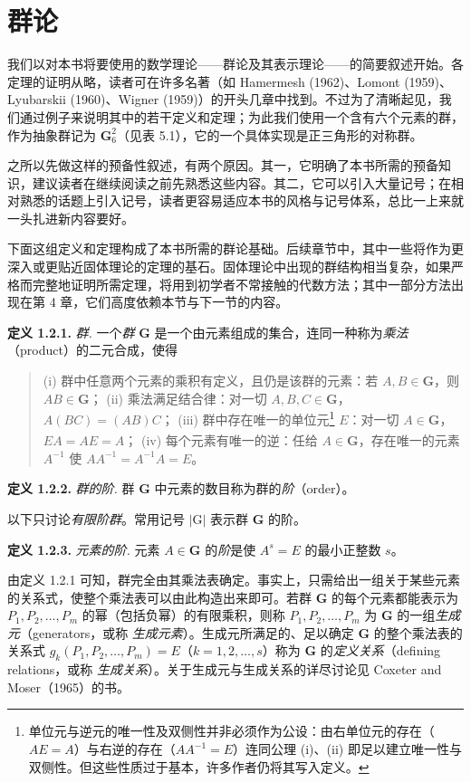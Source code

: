\section{群论}

我们以对本书将要使用的数学理论——群论及其表示理论——的简要叙述开始。各定理的证明从略，读者可在许多名著（如 Hamermesh (1962)、Lomont (1959)、Lyubarskii (1960)、Wigner (1959)）的开头几章中找到。不过为了清晰起见，我们通过例子来说明其中的若干定义和定理；为此我们使用一个含有六个元素的群，作为抽象群记为 $\mathbf{G}_6^2$（见表 5.1），它的一个具体实现是正三角形的对称群。

之所以先做这样的预备性叙述，有两个原因。其一，它明确了本书所需的预备知识，建议读者在继续阅读之前先熟悉这些内容。其二，它可以引入大量记号；在相对熟悉的话题上引入记号，读者更容易适应本书的风格与记号体系，总比一上来就一头扎进新内容要好。

下面这组定义和定理构成了本书所需的群论基础。后续章节中，其中一些将作为更深入或更贴近固体理论的定理的基石。固体理论中出现的群结构相当复杂，如果严格而完整地证明所需定理，将用到初学者不常接触的代数方法；其中一部分方法出现在第 4 章，它们高度依赖本节与下一节的内容。

\textbf{定义 1.2.1.} \textit{群.} 一个\textit{群} $\mathbf{G}$ 是一个由元素组成的集合，连同一种称为\textit{乘法}（product）的二元合成，使得

\begin{quote}
(i) 群中任意两个元素的乘积有定义，且仍是该群的元素：若 $A, B \in \mathbf{G}$，则 $AB \in \mathbf{G}$；
(ii) 乘法满足结合律：对一切 $A, B, C \in \mathbf{G}$，$A(BC) = (AB)C$；
(iii) 群中存在唯一的单位元\footnote{单位元与逆元的唯一性及双侧性并非必须作为公设：由右单位元的存在（$AE = A$）与右逆的存在（$AA^{-1} = E$）连同公理 (i)、(ii) 即足以建立唯一性与双侧性。但这些性质过于基本，许多作者仍将其写入定义。} $E$：对一切 $A \in \mathbf{G}$，$EA = AE = A$；
(iv) 每个元素有唯一的逆\textsuperscript{\ddag}：任给 $A \in \mathbf{G}$，存在唯一的元素 $A^{-1}$ 使 $AA^{-1} = A^{-1}A = E$。
\end{quote}

\textbf{定义 1.2.2.} \textit{群的阶.} 群 $\mathbf{G}$ 中元素的数目称为群的\textit{阶}（order）。

以下只讨论\textit{有限阶群}。常用记号 $|\mathrm{G}|$ 表示群 $\mathbf{G}$ 的阶。

\textbf{定义 1.2.3.} \textit{元素的阶.} 元素 $A \in \mathbf{G}$ 的\textit{阶}是使 $A^{s} = E$ 的最小正整数 $s$。

由定义 1.2.1 可知，群完全由其乘法表确定。事实上，只需给出一组关于某些元素的关系式，使整个乘法表可以由此构造出来即可。若群 $\mathbf{G}$ 的每个元素都能表示为 $P_{1}, P_{2}, \ldots, P_{m}$ 的幂（包括负幂）的有限乘积，则称 $P_{1}, P_{2}, \ldots, P_{m}$ 为 $\mathbf{G}$ 的一组\textit{生成元}（generators，或称 \textit{生成元素}）。生成元所满足的、足以确定 $\mathbf{G}$ 的整个乘法表的关系式 $g_{k}(P_{1}, P_{2}, \ldots, P_{m}) = E$（$k = 1, 2, \ldots, s$）称为 $\mathbf{G}$ 的\textit{定义关系}（defining relations，或称 \textit{生成关系}）。关于生成元与生成关系的详尽讨论见 Coxeter and Moser（1965）的书。

